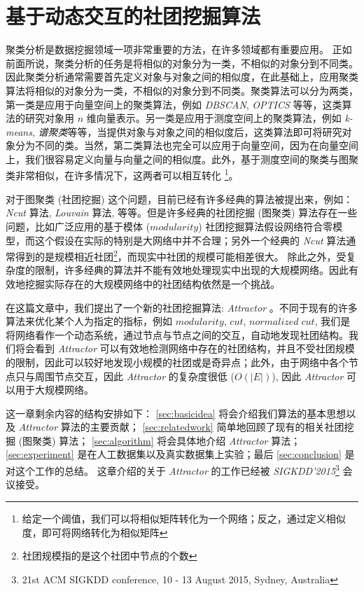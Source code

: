 


\chapter{基于动态交互的社团挖掘算法}
\label{chp:Attractor}
聚类分析是数据挖掘领域一项非常重要的方法，在许多领域都有重要应用。  正如前面所说，聚类分析的任务是将相似的对象分为一类，不相似的对象分到不同类。因此聚类分析通常需要首先定义对象与对象之间的相似度，在此基础上，应用聚类算法将相似的对象分为一类，不相似的对象分到不同类。聚类算法可以分为两类，第一类是应用于向量空间上的聚类算法，例如 \emph{DBSCAN}, \emph{OPTICS} 等等，这类算法的研究对象用 $n$ 维向量表示。另一类是应用于测度空间上的聚类算法，例如 \emph{k-means}, \emph{谱聚类}等等，当提供对象与对象之间的相似度后，这类算法即可将研究对象分为不同的类。当然，第二类算法也完全可以应用于向量空间，因为在向量空间上，我们很容易定义向量与向量之间的相似度。此外，基于测度空间的聚类与图聚类非常相似，在许多情况下，这两者可以相互转化 \footnote{给定一个阈值，我们可以将相似矩阵转化为一个网络；反之，通过定义相似度，即可将网络转化为相似矩阵}。\par
对于图聚类 (社团挖掘) 这个问题，目前已经有许多经典的算法被提出来，例如： \emph{Ncut} 算法, \emph{Louvain} 算法, 等等。但是许多经典的社团挖掘 (图聚类) 算法存在一些问题，比如广泛应用的基于模体 ($modularity$) 社团挖掘算法假设网络符合零模型，而这个假设在实际的特别是大网络中并不合理；另外一个经典的 \emph{Ncut} 算法通常得到的是规模相近社团\footnote{社团规模指的是这个社团中节点的个数}，而现实中社团的规模可能相差很大。 除此之外，受复杂度的限制，许多经典的算法并不能有效地处理现实中出现的大规模网络。因此有效地挖掘实际存在的大规模网络中的社团结构依然是一个挑战。 \par
在这篇文章中，我们提出了一个新的社团挖掘算法: \emph{Attractor} 。不同于现有的许多算法来优化某个人为指定的指标，例如 $modularity$, $cut$, $normalized\;cut$, 我们是将网络看作一个动态系统，通过节点与节点之间的交互，自动地发现社团结构。我们将会看到 \emph{Attractor} 可以有效地检测网络中存在的社团结构，并且不受社团规模的限制，因此可以较好地发现小规模的社团或是奇异点；此外，由于网络中各个节点只与周围节点交互，因此 \emph{Attractor} 的复杂度很低 ($O(|E|)$), 因此 \emph{Attractor} 可以用于大规模网络。 \par
这一章剩余内容的结构安排如下： \ref{sec:basicidea} 将会介绍我们算法的基本思想以及 \emph{Attractor} 算法的主要贡献； \ref{sec:relatedwork} 简单地回顾了现有的相关社团挖掘 (图聚类) 算法； \ref{sec:algorithm} 将会具体地介绍 \emph{Attractor} 算法； \ref{sec:experiment} 是在人工数据集以及真实数据集上实验；最后 \ref{sec:conclusion} 是对这个工作的总结。 这章介绍的关于 \emph{Attractor} 的工作已经被 \emph{SIGKDD'2015}\footnote{21st ACM SIGKDD conference, 10 - 13 August 2015, Sydney, Australia} 会议接受。
